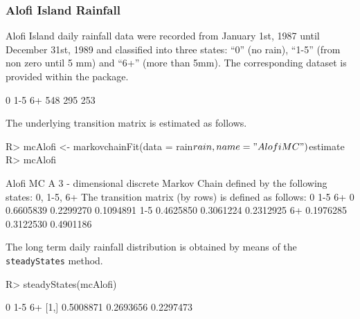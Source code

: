 \documentclass[article,nojss]{jss}
\begin{document}
\hypertarget{sec:wfAlofi}{%
\subsubsection{Alofi Island Rainfall}\label{sec:wfAlofi}}

Alofi Island daily rainfall
data were recorded from January 1st, 1987 until December 31st, 1989 and
classified into three states: ``0'' (no rain), ``1-5'' (from non zero until 5 mm) and ``6+'' (more than 5mm). The corresponding dataset is provided within the  package.

\begin{CodeChunk}


\begin{CodeOutput}

  0 1-5  6+ 
548 295 253 
\end{CodeOutput}
\end{CodeChunk}

The underlying transition matrix is estimated as follows.

\begin{CodeChunk}

\begin{CodeInput}
R> mcAlofi <- markovchainFit(data = rain$rain, name = "Alofi MC")$estimate
R> mcAlofi
\end{CodeInput}

\begin{CodeOutput}
Alofi MC 
 A  3 - dimensional discrete Markov Chain defined by the following states: 
 0, 1-5, 6+ 
 The transition matrix  (by rows)  is defined as follows: 
            0       1-5        6+
0   0.6605839 0.2299270 0.1094891
1-5 0.4625850 0.3061224 0.2312925
6+  0.1976285 0.3122530 0.4901186
\end{CodeOutput}
\end{CodeChunk}

The long term daily rainfall distribution is obtained by means of the \texttt{steadyStates} method.

\begin{CodeChunk}

\begin{CodeInput}
R> steadyStates(mcAlofi)
\end{CodeInput}

\begin{CodeOutput}
             0       1-5        6+
[1,] 0.5008871 0.2693656 0.2297473
\end{CodeOutput}
\end{CodeChunk}
\end{document}
